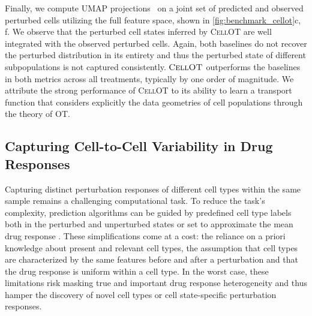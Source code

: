  Finally, we compute \acrfull{UMAP} projections~\citep{umap} on a joint set of predicted and observed perturbed cells utilizing the full feature space, shown in \cref{fig:benchmark_cellot}c, f.
We observe that the perturbed cell states inferred by \textsc{CellOT} are well integrated with the observed perturbed cells. Again, both baselines do not recover the perturbed distribution in its entirety %
and thus the perturbed state of different subpopulations is not captured consistently.
$\textsc{CellOT}$ outperforms the baselines in both metrics across all treatments, typically by one order of magnitude.
We attribute the strong performance of \textsc{CellOT} to its ability to learn a transport function that considers explicitly the data geometries of cell populations through the theory of \acrlong{OT}.

\subsection{Capturing Cell-to-Cell Variability in Drug Responses}
 Capturing distinct perturbation responses of different cell types within the same sample remains a challenging computational task. To reduce the task's complexity, prediction algorithms can be guided by predefined cell type labels both in the perturbed and unperturbed states \citep{chen2020dissecting} or set to approximate the mean drug response \citep{lotfollahi2019scgen}.  These simplifications come at a cost: the reliance on a priori knowledge about present and relevant cell types, the assumption that cell types are characterized by the same features before and after a perturbation and that the drug response is uniform within a cell type.
In the worst case, these limitations risk masking true and important drug response heterogeneity  and thus hamper the discovery of novel cell types or cell state-specific perturbation responses.

